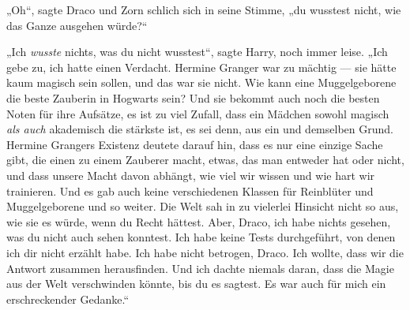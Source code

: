 „Oh“, sagte Draco und Zorn schlich sich in seine Stimme, „du wusstest nicht, wie das Ganze ausgehen würde?“

„Ich \emph{wusste} nichts, was du nicht wusstest“, sagte Harry, noch immer leise.
„Ich gebe zu, ich hatte einen Verdacht. Hermine Granger war zu mächtig — sie hätte kaum magisch sein sollen, und das war sie nicht. Wie kann eine Muggelgeborene die beste Zauberin in Hogwarts sein? Und sie bekommt auch noch die besten Noten für ihre Aufsätze, es ist zu viel Zufall, dass ein Mädchen sowohl magisch \emph{als auch} akademisch die stärkste ist, es sei denn, aus ein und demselben Grund. Hermine Grangers Existenz deutete darauf hin, dass es nur eine einzige Sache gibt, die einen zu einem Zauberer macht, etwas, das man entweder hat oder nicht, und dass unsere Macht davon abhängt, wie viel wir wissen und wie hart wir trainieren. Und es gab auch keine verschiedenen Klassen für Reinblüter und Muggelgeborene und so weiter. Die Welt sah in zu vielerlei Hinsicht nicht so aus, wie sie es würde, wenn du Recht hättest. Aber, Draco, ich habe nichts gesehen, was du nicht auch sehen konntest. Ich habe keine Tests durchgeführt, von denen ich dir nicht erzählt habe. Ich habe nicht betrogen, Draco. Ich wollte, dass wir die Antwort zusammen herausfinden. Und ich dachte niemals daran, dass die Magie aus der Welt verschwinden könnte, bis du es sagtest. Es war auch für mich ein erschreckender Gedanke.“

